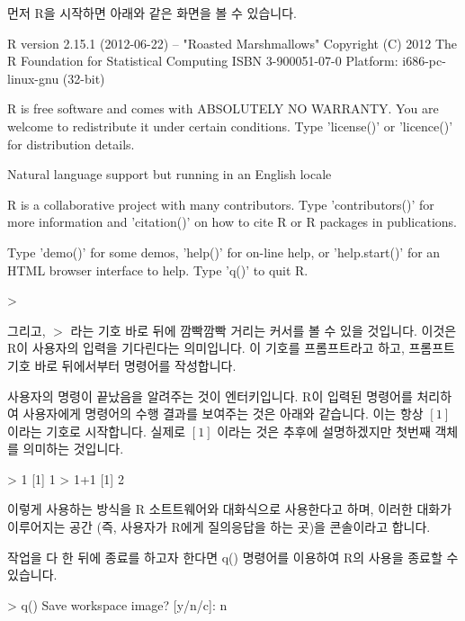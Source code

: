 \documentclass{book}
\begin{document}
먼저 R을 시작하면 아래와 같은 화면을 볼 수 있습니다.

\begin{Schunk}
\begin{Soutput}
R version 2.15.1 (2012-06-22) -- "Roasted Marshmallows"
Copyright (C) 2012 The R Foundation for Statistical Computing
ISBN 3-900051-07-0
Platform: i686-pc-linux-gnu (32-bit)

R is free software and comes with ABSOLUTELY NO WARRANTY.
You are welcome to redistribute it under certain conditions.
Type 'license()' or 'licence()' for distribution details.

  Natural language support but running in an English locale

R is a collaborative project with many contributors.
Type 'contributors()' for more information and
'citation()' on how to cite R or R packages in publications.

Type 'demo()' for some demos, 'help()' for on-line help, or
'help.start()' for an HTML browser interface to help.
Type 'q()' to quit R.

> 
\end{Soutput}
\end{Schunk}

그리고, $>$ 라는 기호 바로 뒤에 깜빡깜빡 거리는 커서를 볼 수 있을 것입니다. 
이것은 R이 사용자의 입력을 기다린다는 의미입니다. 
이 기호를 프롬프트라고 하고, 프롬프트 기호 바로 뒤에서부터 명령어를 작성합니다. 

사용자의 명령이 끝났음을 알려주는 것이 엔터키입니다. 
R이 입력된 명령어를 처리하여 사용자에게 명령어의 수행 결과를 보여주는 것은 아래와 같습니다.
이는 항상 $[1]$ 이라는 기호로 시작합니다. 
실제로 $[1]$ 이라는 것은 추후에 설명하겠지만 첫번째 객체를 의미하는 것입니다.

\begin{Schunk}
\begin{Soutput}
> 1
[1] 1
> 1+1
[1] 2
\end{Soutput}
\end{Schunk}

이렇게 사용하는 방식을 R 소트트웨어와 대화식으로 사용한다고 하며, 이러한 대화가 이루어지는 공간 (즉, 사용자가 R에게 질의응답을 하는 곳)을 콘솔이라고 합니다.

작업을 다 한 뒤에 종료를 하고자 한다면 q() 명령어를 이용하여 R의 사용을 종료할 수 있습니다. 

\begin{Schunk}
\begin{Soutput}
> q()
Save workspace image? [y/n/c]: n
\end{Soutput}
\end{Schunk}
\end{document}
